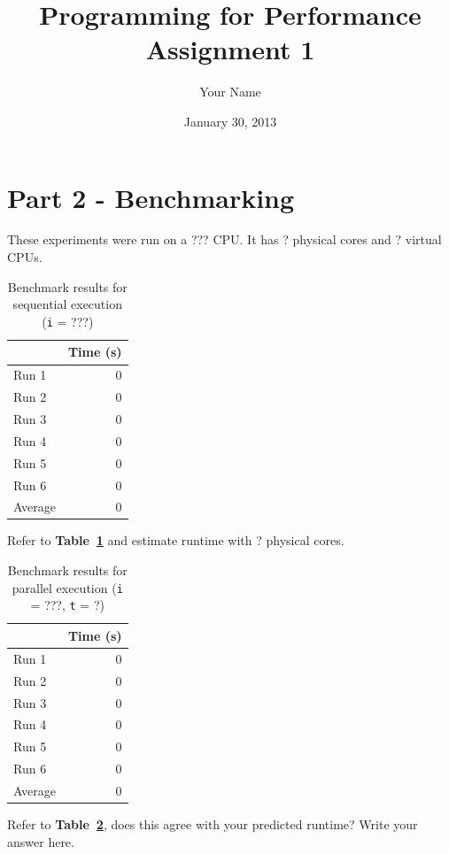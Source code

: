 \documentclass[12pt]{article}
\title{Programming for Performance\\Assignment 1}
\author{Your Name}
\date{January 30, 2013}
\newcommand{\iterations}{???}
\newcommand{\physicalcores}{?}
\newcommand{\virtualcpus}{?}
\begin{document}
\maketitle

\section*{Part 2 - Benchmarking}

These experiments were run on a ??? CPU. It has \physicalcores{} physical cores and \virtualcpus{} virtual
CPUs.

\begin{table}[H]
  \centering
  \begin{tabular}{lr}
    & {\bf Time (s)} \\
    \hline
    Run 1 & 0 \\
    Run 2 & 0 \\
    Run 3 & 0 \\
    Run 4 & 0 \\
    Run 5 & 0 \\
    Run 6 & 0 \\
    \hline
    Average & 0 \\
  \end{tabular}
  \caption{Benchmark results for sequential execution ({\tt i} = \iterations{})}
  \label{tbl_sequential}
\end{table}

Refer to {\bf Table~\ref{tbl_sequential}} and estimate runtime with
\physicalcores{} physical cores.

\begin{table}[H]
  \centering
  \begin{tabular}{lr}
    & {\bf Time (s)} \\
    \hline
    Run 1 & 0 \\
    Run 2 & 0 \\
    Run 3 & 0 \\
    Run 4 & 0 \\
    Run 5 & 0 \\
    Run 6 & 0 \\
    \hline
    Average & 0 \\
  \end{tabular}
  \caption{Benchmark results for parallel execution ({\tt i} = \iterations{},
    {\tt t} = \physicalcores{})}
  \label{tbl_parallel_physicalcores}
\end{table}

Refer to {\bf Table~\ref{tbl_parallel_physicalcores}}, does this agree with your
predicted runtime? Write your answer here.
\end{document}
